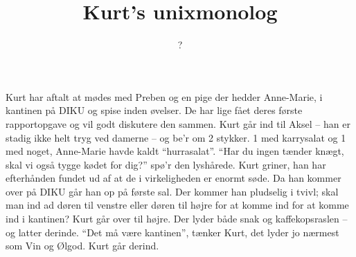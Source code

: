 \documentclass[a4paper,11pt]{article}
\title{Kurt's unixmonolog}
\author{?}
\begin{document}
\maketitle

\begin{sketch}

Kurt har aftalt at mødes med Preben og en pige der hedder Anne-Marie, i kantinen på DIKU og spise inden øvelser. De har lige fået deres første rapportopgave og vil godt diskutere den sammen. Kurt går ind til Aksel -- han er stadig ikke helt tryg ved damerne -- og be'r om 2 stykker. 1 med karrysalat og 1 med noget, Anne-Marie havde kaldt ``hurrasalat''. ``Har du ingen tænder knægt, skal vi også tygge kødet for dig?'' spø'r den lyshårede. Kurt griner, han har efterhånden fundet ud af at de i virkeligheden er enormt søde. Da han kommer over på DIKU går han op på første sal. Der kommer han pludselig i tvivl; skal man ind ad døren til venstre eller døren til højre for at komme ind for at komme ind i kantinen? Kurt går over til højre. Der lyder både snak og kaffekopsraslen -- og latter derinde. ``Det må være kantinen'', tænker Kurt, det lyder jo nærmest som Vin og Ølgod. Kurt går derind.

\end{sketch}
\end{document}
